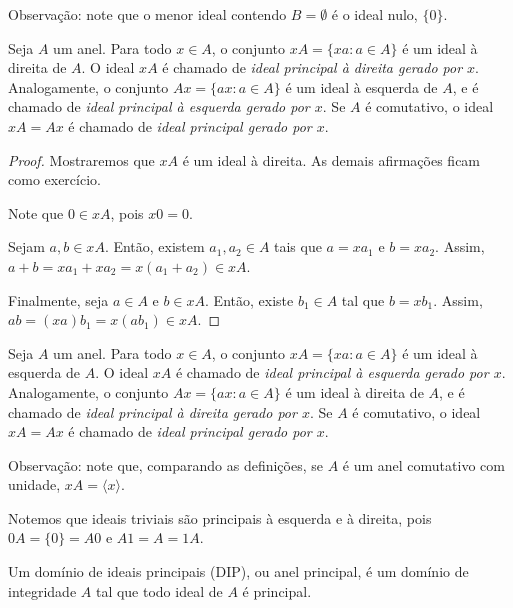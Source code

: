 Observação: note que o menor ideal contendo $B=\emptyset$ é o ideal nulo, $\{0\}$.

\begin{prop}
    Seja $A$ um anel. Para todo $x \in A$, o conjunto $xA=\{xa:a \in A\}$ é um ideal à direita de $A$. O ideal $xA$ é chamado de \emph{ideal principal à direita gerado por $x$}.
    Analogamente, o conjunto $Ax=\{ax:a \in A\}$ é um ideal à esquerda de $A$, e é chamado de \emph{ideal principal à esquerda gerado por $x$}.
    Se $A$ é comutativo, o ideal $xA=Ax$ é chamado de \emph{ideal principal gerado por $x$}.
\end{prop}
\begin{proof}
Mostraremos que $xA$ é um ideal à direita. As demais afirmações ficam como exercício.

Note que $0 \in xA$, pois $x0=0$.

Sejam $a, b \in xA$. Então, existem $a_1, a_2 \in A$ tais que $a=xa_1$ e $b=xa_2$. Assim, $a+b=xa_1+xa_2=x(a_1+a_2) \in xA$.

Finalmente, seja $a \in A$ e $b \in xA$. Então, existe $b_1 \in A$ tal que $b=xb_1$. Assim, $ab=(xa)b_1=x(ab_1) \in xA$.
\end{proof}
\begin{definition}
    Seja $A$ um anel. Para todo $x \in A$, o conjunto $xA=\{xa:a \in A\}$ é um ideal à esquerda de $A$. O ideal $xA$ é chamado de \emph{ideal principal à esquerda gerado por $x$}.
    Analogamente, o conjunto $Ax=\{ax:a \in A\}$ é um ideal à direita de $A$, e é chamado de \emph{ideal principal à direita gerado por $x$}.
    Se $A$ é comutativo, o ideal $xA=Ax$ é chamado de \emph{ideal principal gerado por $x$}.
\end{definition}

Observação: note que, comparando as definições, se $A$ é um anel comutativo com unidade, $xA=\langle x\rangle$.

Notemos que ideais triviais são principais à esquerda e à direita, pois $0A=\{0\}=A0$ e $A1=A=1A$.

\begin{definition}
    Um domínio de ideais principais (DIP), ou anel principal, é um domínio de integridade $A$ tal que todo ideal de $A$ é principal.
\end{definition}

